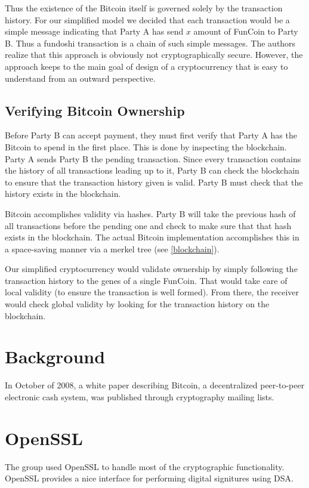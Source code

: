 \documentclass[12pt]{article}
\begin{document}
Thus the existence of the Bitcoin itself is governed solely by the transaction history. For our
simplified model we decided that each transaction would be a simple message indicating that Party
A has send $x$ amount of FunCoin to Party B. Thus a fundoshi transaction is a chain of such simple
messages. The authors realize that this approach is obviously not cryptographically secure. However,
the approach keeps to the main goal of design of a cryptocurrency that is easy to understand from an
outward perspective.

\subsection{Verifying Bitcoin Ownership}
Before Party B can accept payment, they must first verify that Party A has the Bitcoin to spend in the first
place. This is done by inspecting the blockchain. Party A sends Party B the pending transaction. Since every
transaction contains the history of all transactions leading up to it, Party B can check the blockchain
to ensure that the transaction history given is valid. Party B must check that the history
exists in the blockchain.

Bitcoin accomplishes validity via hashes. Party B will take the previous hash of all transactions before the pending one
and check to make sure that that hash exists in the blockchain. The actual Bitcoin implementation accomplishes
this in a space-saving manner via a merkel tree (see \ref{blockchain}).

Our simplified cryptocurrency would validate ownership by simply following the transaction history to the
genes of a single FunCoin. That would take care of local validity (to ensure the transaction is well formed).
From there, the receiver would check global validity by looking for the transaction history on the blockchain.



\section{Background}
In October of 2008, a white paper\cite{nakamoto:bitcoin} describing Bitcoin, a decentralized peer-to-peer electronic cash system, was published through cryptography mailing lists.

\section{OpenSSL}
The group used OpenSSL to handle most of the cryptographic functionality. OpenSSL provides a nice interface for performing digital signitures using DSA.



\end{document}
